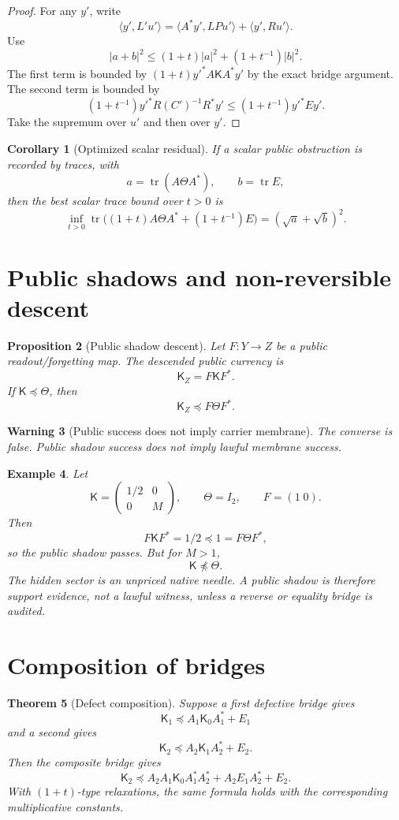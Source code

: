 \documentclass[11pt]{article}
\newtheorem{theorem}{Theorem}[section]
\newtheorem{proposition}[theorem]{Proposition}
\newtheorem{warning}[theorem]{Warning}
\newtheorem{corollary}[theorem]{Corollary}
\newtheorem{example}[theorem]{Example}
\newcommand{\K}{\mathsf K}
\newcommand{\Tr}{\operatorname{tr}}
\newcommand{\pre}{\preceq}
\begin{document}
\begin{proof}
For any \(y'\), write
\[
\langle y',L'u'\rangle
=\langle A^*y',LPu'\rangle+\langle y',Ru'\rangle.
\]
Use
\[
|a+b|^2\le (1+t)|a|^2+(1+t^{-1})|b|^2.
\]
The first term is bounded by \((1+t)y'^*A\K A^*y'\) by the exact bridge argument. The second term is bounded by
\[
(1+t^{-1})y'^*R(C')^{-1}R^*y'\le (1+t^{-1})y'^*Ey'.
\]
Take the supremum over \(u'\) and then over \(y'\).
\end{proof}

\begin{corollary}[Optimized scalar residual]
If a scalar public obstruction is recorded by traces, with
\[
a=\Tr(A\Theta A^*),\qquad b=\Tr E,
\]
then the best scalar trace bound over \(t>0\) is
\[
\inf_{t>0}\Tr\bigl((1+t)A\Theta A^*+(1+t^{-1})E\bigr)=(\sqrt a+\sqrt b)^2.
\]
\end{corollary}

\section{Public shadows and non-reversible descent}
\begin{proposition}[Public shadow descent]
Let \(F:Y\to Z\) be a public readout/forgetting map. The descended public currency is
\[
\K_Z=F\K F^*.
\]
If \(\K\pre\Theta\), then
\[
\K_Z\pre F\Theta F^*.
\]
\end{proposition}

\begin{warning}[Public success does not imply carrier membrane]
The converse is false. Public shadow success does not imply lawful membrane success.
\end{warning}

\begin{example}
Let
\[
\K=\begin{pmatrix}1/2&0\\0&M\end{pmatrix},
\qquad
\Theta=I_2,
\qquad
F=(1\;0).
\]
Then
\[
F\K F^*=1/2\pre1=F\Theta F^*,
\]
so the public shadow passes. But for \(M>1\),
\[
\K\npreceq\Theta.
\]
The hidden sector is an unpriced native needle. A public shadow is therefore support evidence, not a lawful witness, unless a reverse or equality bridge is audited.
\end{example}

\section{Composition of bridges}
\begin{theorem}[Defect composition]
Suppose a first defective bridge gives
\[
\K_1\pre A_1\K_0A_1^*+E_1
\]
and a second gives
\[
\K_2\pre A_2\K_1A_2^*+E_2.
\]
Then the composite bridge gives
\[
\boxed{\K_2\pre A_2A_1\K_0A_1^*A_2^*+A_2E_1A_2^*+E_2.}
\]
With \((1+t)\)-type relaxations, the same formula holds with the corresponding multiplicative constants.
\end{theorem}
\end{document}
